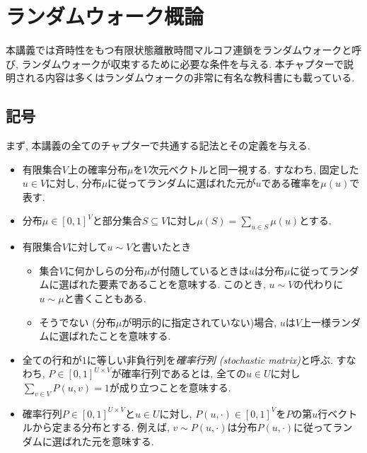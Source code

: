 \chapter{ランダムウォーク概論}
本講義では斉時性をもつ有限状態離散時間マルコフ連鎖をランダムウォークと呼び,
ランダムウォークが収束するために必要な条件を与える.
本チャプターで説明される内容は多くはランダムウォークの非常に有名な教科書\cite[Chapter 4,12]{LP17}にも載っている.

\section{記号}
まず, 本講義の全てのチャプターで共通する記法とその定義を与える.
\begin{itemize}
\item 有限集合$V$上の確率分布$\mu$を$V$次元ベクトルと同一視する.
すなわち, 固定した$u\in V$に対し, 分布$\mu$に従ってランダムに選ばれた元が$u$である確率を$\mu(u)$で表す.
\item 分布$\mu \in [0,1]^V$と部分集合$S\subseteq V$に対し$\mu(S) = \sum_{u\in S}\mu(u)$とする.
\item 有限集合$V$に対して$u\sim V$と書いたとき
\begin{itemize}
\item 集合$V$に何かしらの分布$\mu$が付随しているときは$u$は分布$\mu$に従ってランダムに選ばれた要素であることを意味する. このとき, $u\sim V$の代わりに$u \sim \mu$と書くこともある.
\item そうでない (分布$\mu$が明示的に指定されていない)場合, $u$は$V$上一様ランダムに選ばれたことを意味する.
\end{itemize}
\item 全ての行和が$1$に等しい非負行列を\emph{確率行列 (stochastic matrix)}と呼ぶ.
すなわち, $P \in [0,1]^{U\times V}$が確率行列であるとは, 全ての$u\in U$に対し$\sum_{v \in V} P(u,v) = 1$が成り立つことを意味する.
\item 確率行列$P\in [0,1]^{U\times V}$と$u\in U$に対し, $P(u,\cdot) \in [0,1]^V$を$P$の第$u$行ベクトルから定まる分布とする. 例えば, $v \sim P(u,\cdot)$は分布$P(u,\cdot)$に従ってランダムに選ばれた元を意味する.
\end{itemize}
